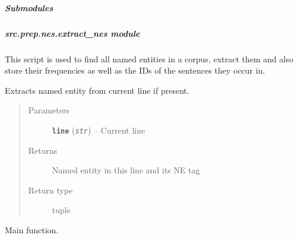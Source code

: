 \documentclass[letterpaper,10pt,english]{sphinxmanual}
\begin{document}
\subparagraph{Submodules}
\label{src.prep.nes:submodules}

\subparagraph{src.prep.nes.extract\_nes module}
\label{src.prep.nes:src-prep-nes-extract-nes-module}\label{src.prep.nes:module-src.prep.nes.extract_nes}
This script is used to find all named entities in a corpus, extract them and also store their frequencies as well as
the IDs of the sentences they occur in.

\begin{fulllineitems}
\label{src.prep.nes:src.prep.nes.extract_nes.extract_named_entity}
Extracts named entity from current line if present.
\begin{quote}\begin{description}
\item[{Parameters}] \leavevmode
\textbf{\texttt{line}} (\emph{\texttt{str}}) -- Current line

\item[{Returns}] \leavevmode
Named entity in this line and its NE tag

\item[{Return type}] \leavevmode
tuple

\end{description}\end{quote}

\end{fulllineitems}


\begin{fulllineitems}
\label{src.prep.nes:src.prep.nes.extract_nes.main}
Main function.

\end{fulllineitems}

\end{document}
